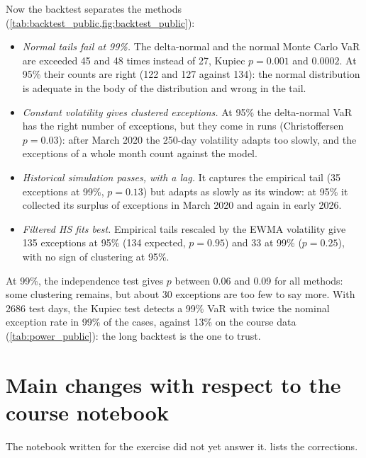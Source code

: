 \documentclass[11pt,a4paper]{article}
\begin{document}
Now the backtest separates the methods (\cref{tab:backtest_public,fig:backtest_public}):
\begin{itemize}
  \item \emph{Normal tails fail at 99\%.} The delta-normal and the normal Monte Carlo VaR are exceeded 45 and 48
    times instead of 27, Kupiec $p = 0.001$ and $0.0002$. At 95\% their counts are right (122 and 127 against 134):
    the normal distribution is adequate in the body of the distribution and wrong in the tail.
  \item \emph{Constant volatility gives clustered exceptions.} At 95\% the delta-normal VaR has the right number of
    exceptions, but they come in runs (Christoffersen $p = 0.03$): after March 2020 the 250-day volatility adapts too
    slowly, and the exceptions of a whole month count against the model.
  \item \emph{Historical simulation passes, with a lag.} It captures the empirical tail (35 exceptions at 99\%,
    $p = 0.13$) but adapts as slowly as its window: at 95\% it collected its surplus of exceptions in March 2020
    and again in early 2026.
  \item \emph{Filtered HS fits best.} Empirical tails rescaled by the EWMA volatility give 135 exceptions at 95\%
    (134 expected, $p = 0.95$) and 33 at 99\% ($p = 0.25$), with no sign of clustering at 95\%.
\end{itemize}
At 99\%, the independence test gives $p$ between 0.06 and 0.09 for all methods: some clustering remains, but about
30 exceptions are too few to say more. With 2686 test days, the Kupiec test detects a 99\% VaR with twice the nominal
exception rate in 99\% of the cases, against 13\% on the course data (\cref{tab:power_public}): the long backtest is
the one to trust.

\begin{table}[H]
  \centering\small
  \caption{Power of the Kupiec test (5\% significance): course backtest and public-data backtest.}
  \label{tab:power_public}
  
\end{table}

\section{Main changes with respect to the course notebook}

The notebook written for the exercise did not yet answer it.  lists the corrections.
\end{document}
